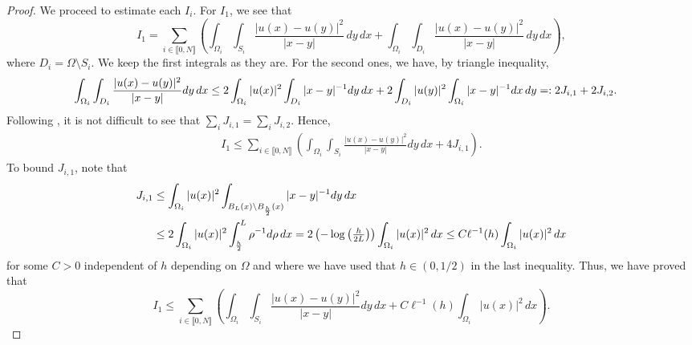\documentclass[11 pt]{article}
\newcommand\inter[1]{\llbracket #1\rrbracket}
\numberwithin{equation}{section}
\begin{document}
\begin{proof}
We proceed to estimate each $I_i$. For $I_1$, we see that  
%
\begin{equation*}
    I_1=\sum_{i\in\inter{0,N}}\left(\int_{\Omega_i}\int_{S_i}\frac{|u(x)-u(y)|^2}{|x-y|}\,dy\,dx+\int_{\Omega_i}\int_{D_i}\frac{|u(x)-u(y)|^2}{|x-y|}\,dy\,dx\right),
\end{equation*}
%
where $D_i=\Omega\setminus S_i$. We keep the first integrals as they are. For the second ones, we have, by triangle inequality,
%
\begin{align*}\notag
    \int_{\Omega_i}&\int_{D_i} \frac{|u(x)-u(y)|^2}{|x-y|}dy\,dx\leq 2\int_{\Omega_i}|u(x)|^2\int_{D_i}|x-y|^{-1}dy\,dx+2\int_{D_i}|u(y)|^2\int_{\Omega_i}|x-y|^{-1}dx\,dy=:2J_{i,1}+2J_{i,2}.
\end{align*}
%
Following \cite[Prop. 1.2.24]{Bor17}, it is not difficult to see that $\sum_{i}{J_{i,1}}=\sum_{i}{J_{i,2}}$. Hence,
%
\begin{align*}
    I_1\leq \sum_{i\in\inter{0,N}}\left(\int_{\Omega_i}\int_{S_i}\frac{|u(x)-u(y)|^2}{|x-y|}dy\,dx+4 J_{i,1}\right).
\end{align*}
%
To bound $J_{i,1}$, note that
%
\begin{align}\notag
    J_{i,1}&\leq \int_{\Omega_i}|u(x)|^2\int_{B_{L}(x)\setminus B_{\frac{h}{2}}(x)}|x-y|^{-1}dy\,dx \\\label{eq:est_Ij1}
    &\leq 2\int_{\Omega_i}|u(x)|^2\int_{\frac{h}{2}}^{L}\rho^{-1}d\rho\,dx
    =2\left(-\log\left(\tfrac{h}{2L}\right)\right)\int_{\Omega_i}|u(x)|^2\,dx
    \leq C\ell^{-1} (h)\int_{\Omega_i}|u(x)|^2\,dx
\end{align}
%
for some $C>0$ independent of $h$ depending on $\Omega$ and where we have used that $h\in(0,1/2)$ in the last inequality. Thus, we have proved that
%
\begin{equation}\label{eq:est_I1_final}
    I_1\leq \sum_{i\in\inter{0,N}}\left(\int_{\Omega_i}\int_{S_i}\frac{|u(x)-u(y)|^2}{|x-y|}dy\,dx + C\ell^{-1}(h)\int_{\Omega_i}|u(x)|^2\,dx\right).
\end{equation}
%


\end{proof}
\end{document}
